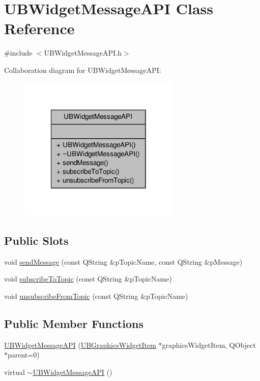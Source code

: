 \hypertarget{class_u_b_widget_message_a_p_i}{\section{U\-B\-Widget\-Message\-A\-P\-I Class Reference}
\label{df/d09/class_u_b_widget_message_a_p_i}
}


{\ttfamily \#include $<$U\-B\-Widget\-Message\-A\-P\-I.\-h$>$}



Collaboration diagram for U\-B\-Widget\-Message\-A\-P\-I\-:
\nopagebreak
\begin{figure}[H]
\begin{center}
\leavevmode
\includegraphics[width=218pt]{d8/da8/class_u_b_widget_message_a_p_i__coll__graph}
\end{center}
\end{figure}
\subsection*{Public Slots}
\begin{DoxyCompactItemize}
\item 
void \hyperlink{class_u_b_widget_message_a_p_i_af106f68de4e0ac7a6f7928080b24abe3}{send\-Message} (const Q\-String \&p\-Topic\-Name, const Q\-String \&p\-Message)
\item 
void \hyperlink{class_u_b_widget_message_a_p_i_a0c8ae74bb7102109d7a343c1053c3f0f}{subscribe\-To\-Topic} (const Q\-String \&p\-Topic\-Name)
\item 
void \hyperlink{class_u_b_widget_message_a_p_i_a08f6a980f76f590775868e4f4d6c68eb}{unsubscribe\-From\-Topic} (const Q\-String \&p\-Topic\-Name)
\end{DoxyCompactItemize}
\subsection*{Public Member Functions}
\begin{DoxyCompactItemize}
\item 
\hyperlink{class_u_b_widget_message_a_p_i_a1497bd6a02aed1fbe8299903af73450b}{U\-B\-Widget\-Message\-A\-P\-I} (\hyperlink{class_u_b_graphics_widget_item}{U\-B\-Graphics\-Widget\-Item} $\ast$graphics\-Widget\-Item, Q\-Object $\ast$parent=0)
\item 
virtual \hyperlink{class_u_b_widget_message_a_p_i_af047cb11849fe33f642093620b6e413d}{$\sim$\-U\-B\-Widget\-Message\-A\-P\-I} ()
\end{DoxyCompactItemize}


